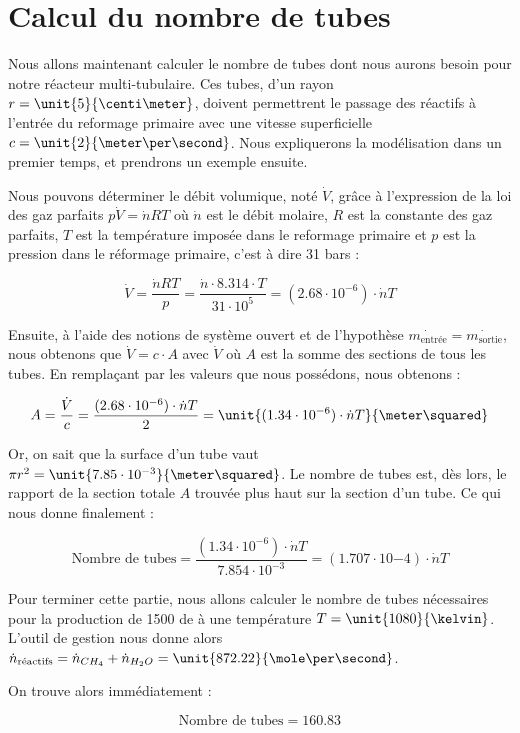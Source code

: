 \section{Calcul du nombre de tubes}
Nous allons maintenant calculer le nombre de tubes dont nous aurons besoin
pour notre réacteur multi-tubulaire. Ces tubes, d'un rayon $r = \unit{5}{\centi\meter}$,
doivent permettrent le passage des réactifs à l'entrée du reformage primaire avec une
vitesse superficielle $c = \unit{2}{\meter\per\second}$. 
Nous expliquerons la modélisation dans un premier temps, et prendrons un exemple ensuite.

Nous pouvons déterminer le débit volumique, noté $\dot{V}$, grâce à l'expression de la loi des gaz
parfaits $p\dot{V} = \dot{n}RT$ où $\dot{n}$ est le débit molaire, $R$ est la constante des gaz parfaits,
$T$ est la température imposée dans le reformage primaire et $p$ est la
pression dans le réformage primaire, c'est à dire 31 bars :

$$\dot{V} = \frac{\dot{n}RT}{p} = \frac{\dot{n}\cdot 8.314\cdot T}{31\cdot10^5}
 = (2.68\cdot10^{-6})\cdot \dot{n}T$$

Ensuite, à l'aide des notions de système ouvert et de l'hypothèse 
$\dot{m_{\text{entrée}}} = \dot{m_{\text{sortie}}}$, nous obtenons que $\dot{V} 
= c \cdot  A $ avec $ \dot{V}$ où $A$ est la somme des sections de tous les tubes.
En remplaçant par les valeurs que nous possédons, nous obtenons :

$$A = \frac{\dot{V}}{c} = \frac{(2.68\cdot10^{-6})\cdot \dot{n}T}{2} 
= \unit{(1.34\cdot10^{-6})\cdot \dot{n}T}{\meter\squared}$$

Or, on sait que la surface d'un tube vaut $\pi r^2
= \unit{7.85\cdot10^{-3}}{\meter\squared}$. Le nombre de tubes est,
dès lors, le rapport de la section totale $A$ trouvée plus haut sur
la section d'un tube. Ce qui nous donne finalement : 

$$\text{Nombre de tubes} = \frac{(1.34\cdot10^{-6})\cdot \dot{n}T}{7.854\cdot10^{-3}}
= (1.707\cdot10{-4})\cdot\dot{n}T$$

Pour terminer cette partie, nous allons calculer le nombre de tubes
nécessaires pour la production de \unit{1500}{\ton\per\dday} de 
à une température $T = \unit{1080}{\kelvin}$. L'outil de gestion
nous donne alors $\dot{n}_{\text{réactifs}} = \dot{n}_{CH_4} + \dot{n}_{H_2O} 
= \unit{872.22}{\mole\per\second}$.

On trouve alors immédiatement :

$$\text{Nombre de tubes} = 160.83$$

